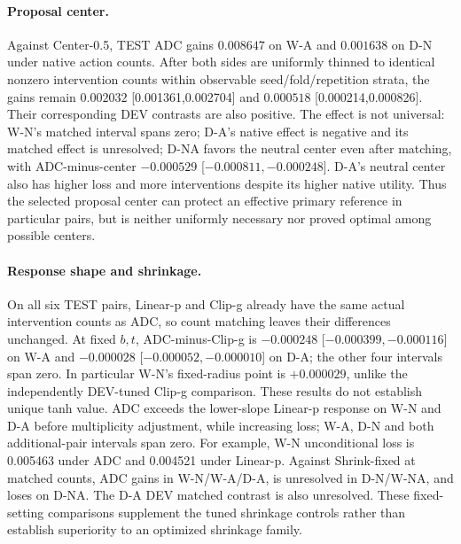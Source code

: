 \documentclass[11pt,a4paper]{article}
\begin{document}
\paragraph{Proposal center.}
Against Center-0.5, TEST ADC gains $0.008647$ on W-A and $0.001638$ on D-N under native action counts. After both sides are uniformly thinned to identical nonzero intervention counts within observable seed/fold/repetition strata, the gains remain $0.002032$ [0.001361,0.002704] and $0.000518$ [0.000214,0.000826]. Their corresponding DEV contrasts are also positive. The effect is not universal: W-N's matched interval spans zero; D-A's native effect is negative and its matched effect is unresolved; D-NA favors the neutral center even after matching, with ADC-minus-center $-0.000529$ [$-0.000811,-0.000248$]. D-A's neutral center also has higher loss and more interventions despite its higher native utility. Thus the selected proposal center can protect an effective primary reference in particular pairs, but is neither uniformly necessary nor proved optimal among possible centers.

\paragraph{Response shape and shrinkage.}
On all six TEST pairs, Linear-p and Clip-g already have the same actual intervention counts as ADC, so count matching leaves their differences unchanged. At fixed $b,t$, ADC-minus-Clip-g is $-0.000248$ [$-0.000399,-0.000116$] on W-A and $-0.000028$ [$-0.000052,-0.000010$] on D-A; the other four intervals span zero. In particular W-N's fixed-radius point is $+0.000029$, unlike the independently DEV-tuned Clip-g comparison. These results do not establish unique tanh value. ADC exceeds the lower-slope Linear-p response on W-N and D-A before multiplicity adjustment, while increasing loss; W-A, D-N and both additional-pair intervals span zero. For example, W-N unconditional loss is 0.005463 under ADC and 0.004521 under Linear-p. Against Shrink-fixed at matched counts, ADC gains in W-N/W-A/D-A, is unresolved in D-N/W-NA, and loses on D-NA. The D-A DEV matched contrast is also unresolved. These fixed-setting comparisons supplement the tuned shrinkage controls rather than establish superiority to an optimized shrinkage family.
\end{document}
